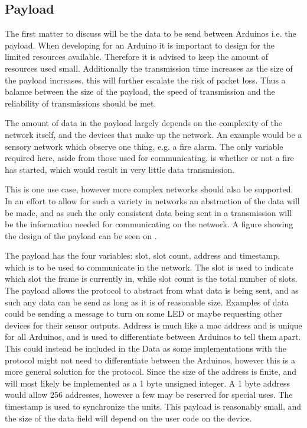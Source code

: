 \subsection{Payload}
The first matter to discuss will be the data to be send between Arduinos i.e. the payload.
When developing for an Arduino it is important to design for the limited resources available.
Therefore it is advised to keep the amount of resources used small.
Additionally the transmission time increases as the size of the payload increases, this will further escalate the risk of packet loss. 
Thus a balance between the size of the payload, the speed of transmission and the reliability of transmissions should be met. 

\bigskip 
The amount of data in the payload largely depends on the complexity of the network itself, and the devices that make up the network.
An example would be a sensory network which observe one thing, e.g. a fire alarm. 
The only variable required here, aside from those used for communicating, is whether or not a fire has started, which would result in very little data transmission.

This is one use case, however more complex networks should also be supported. 
In an effort to allow for such a variety in networks an abstraction of the data will be made, and as such the only consistent data being sent in a transmission will be the information needed for communicating on the network.
A figure showing the design of the payload can be seen on .

\bigskip

The payload has the four variables: slot, slot count, address and timestamp, which is to be used to communicate in the network.
The slot is used to indicate which slot the frame is currently in, while slot count is the total number of slots.
The payload allows the protocol to abstract from what data is being sent, and as such any data can be send as long as it is of reasonable size. 
Examples of data could be sending a message to turn on some LED or maybe requesting other devices for their sensor outputs.
Address is much like a mac address and is unique for all Arduinos, and is used to differentiate between Arduinos to tell them apart.
This could instead be included in the Data as some implementations with the protocol might not need to differentiate between the Arduinos, however this is a more general solution for the protocol.
Since the size of the address is finite, and will most likely be implemented as a 1 byte unsigned integer. 
A 1 byte address would allow 256 addresses, however a few may be reserved for special uses.
The timestamp is used to synchronize the units.
This payload is reasonably small, and the size of the data field will depend on the user code on the device.
